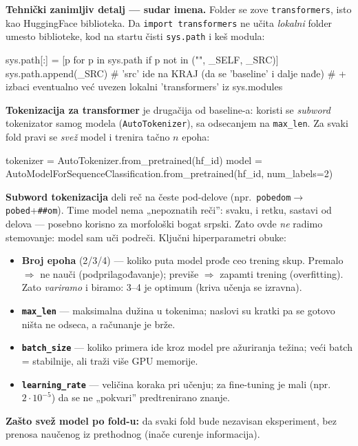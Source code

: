 \documentclass[11pt,a4paper]{article}
\newcommand{\kod}[1]{\texttt{#1}}
\begin{document}
\textbf{Tehnički zanimljiv detalj --- sudar imena.} Folder se zove \kod{transformers},
isto kao HuggingFace biblioteka. Da \kod{import transformers} ne učita \emph{lokalni}
folder umesto biblioteke, kod na startu čisti \kod{sys.path} i keš modula:
\begin{code}
sys.path[:] = [p for p in sys.path if p not in ("", _SELF, _SRC)]
sys.path.append(_SRC)   # 'src' ide na KRAJ (da se 'baseline' i dalje nađe)
# + izbaci eventualno već uvezen lokalni 'transformers' iz sys.modules
\end{code}

\textbf{Tokenizacija za transformer} je drugačija od baseline-a: koristi se
\emph{subword} tokenizator samog modela (\kod{AutoTokenizer}), sa odsecanjem na
\kod{max\_len}. Za svaki fold pravi se \emph{svež} model i trenira tačno $n$ epoha:
\begin{code}
tokenizer = AutoTokenizer.from_pretrained(hf_id)
model = AutoModelForSequenceClassification.from_pretrained(hf_id, num_labels=2)
\end{code}

\begin{teorija}
\textbf{Subword tokenizacija} deli reč na česte pod-delove (npr.\ \kod{pobedom}$\to$
\kod{pobed}+\kod{\#\#om}). Time model nema „nepoznatih reči'': svaku, i retku, sastavi
od delova --- posebno korisno za morfološki bogat srpski. Zato ovde \emph{ne} radimo
stemovanje: model sam uči podreči. Ključni hiperparametri obuke:
\begin{itemize}[nosep]
  \item \textbf{Broj epoha} (2/3/4) --- koliko puta model prođe ceo trening skup.
    Premalo $\Rightarrow$ ne nauči (podprilagođavanje); previše $\Rightarrow$ zapamti
    trening (overfitting). Zato \emph{variramo} i biramo: 3--4 je optimum (kriva učenja
    se izravna).
  \item \textbf{\kod{max\_len}} --- maksimalna dužina u tokenima; naslovi su kratki pa
    se gotovo ništa ne odseca, a računanje je brže.
  \item \textbf{\kod{batch\_size}} --- koliko primera ide kroz model pre ažuriranja
    težina; veći batch = stabilnije, ali traži više GPU memorije.
  \item \textbf{\kod{learning\_rate}} --- veličina koraka pri učenju; za fine-tuning je
    mali (npr.\ $2\!\cdot\!10^{-5}$) da se ne „pokvari'' predtrenirano znanje.
\end{itemize}
\textbf{Zašto svež model po fold-u:} da svaki fold bude nezavisan eksperiment, bez
prenosa naučenog iz prethodnog (inače curenje informacija).
\end{teorija}
\end{document}
